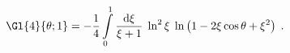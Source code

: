 \begin{equation}
\label{Gl4(theta,1)}
\Gl{4}{\theta; 1} = -\frac{1}{4}
\int\limits_0^1 \frac{{\rm d}\xi}{\xi+1}\;
\ln^2\xi\; \ln\left(1-2\xi\cos\theta+\xi^2\right) \; . 
\end{equation}

